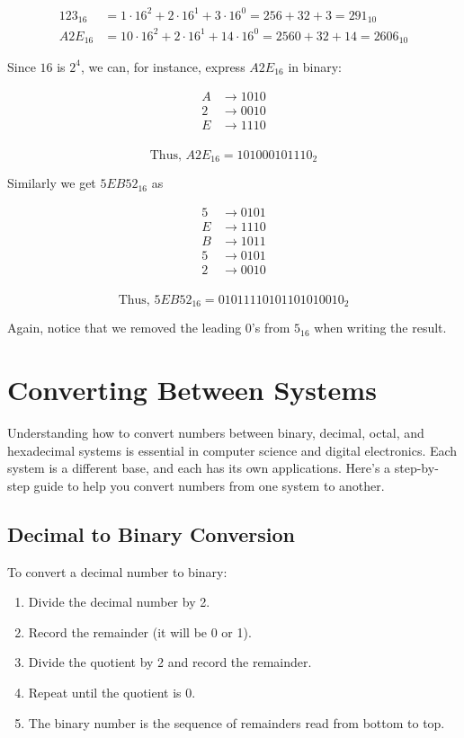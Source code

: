 \[
\begin{aligned}
123_{16} &= 1 \cdot 16^2 + 2 \cdot 16^1 + 3 \cdot 16^0  = 256 + 32 + 3 = 291_{10} \\
A2E_{16} & = 10 \cdot 16^2 + 2 \cdot 16^1 + 14 \cdot 16^0 = 2560 + 32 + 14 = 2606_{10}
\end{aligned}
\]

Since \(16\) is \(2^4\), we can, for instance, express $A2E_{16}$ in binary:

\[
\begin{aligned}
A & \rightarrow 1010 \\
2 & \rightarrow 0010 \\
E & \rightarrow 1110 \\
\end{aligned}
\]

\[
\text{Thus, } A2E_{16} = 101000101110_2
\]

Similarly we get $5EB52_{16}$ as

\[
\begin{aligned}
5 & \rightarrow 0101 \\
E & \rightarrow 1110 \\
B & \rightarrow 1011 \\
5 & \rightarrow 0101 \\
2 & \rightarrow 0010 \\
\end{aligned}
\]

\[
\text{Thus, } 5EB52_{16} = 01011110101101010010_2
\]

Again, notice that we removed the leading 0's from $5_{16}$ when writing the result.

\section{Converting Between Systems}

Understanding how to convert numbers between binary, decimal, octal, and hexadecimal systems is essential in computer science and digital electronics. Each system is a different base, and each has its own applications. Here's a step-by-step guide to help you convert numbers from one system to another.

\subsection*{Decimal to Binary Conversion}
To convert a decimal number to binary:
\begin{enumerate}
    \item Divide the decimal number by 2.
    \item Record the remainder (it will be 0 or 1).
    \item Divide the quotient by 2 and record the remainder.
    \item Repeat until the quotient is 0.
    \item The binary number is the sequence of remainders read from bottom to top.
\end{enumerate}

